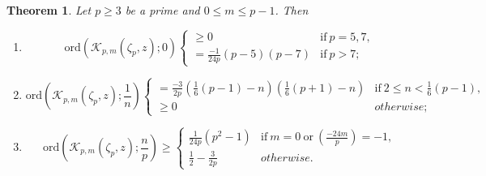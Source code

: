 \documentclass[12pt]{amsart}
\newtheorem{theorem}{Theorem}[section]
\theoremstyle{definition}
\theoremstyle{remark}
\numberwithin{equation}{section}
\newcommand\leg[2]{\genfrac{(}{)}{}{}{#1}{#2}} %
\newcommand\ord{\mbox{ord}}
\begin{document}
\begin{theorem}
\label{thm:ordlb}
Let $p \geq 3$ be a prime and $0 \leq m \leq p-1$. Then 
\begin{enumerate}
\item[(i)]
$$
\ord(\mathcal{K}_{p,m}(\zeta_p,z);0) 
\begin{cases}
      \geq 0 & \text{if}\ p=5, 7, \\
      =\frac{-1}{24p}(p-5)(p-7) & \text{if}\ p>7;
\end{cases} 
$$
\item[(ii)]
$$
\ord(\mathcal{K}_{p,m}(\zeta_p,z);\frac{1}{n}) 
\begin{cases}
 =\frac{-3}{2p}(\frac{1}{6} (p-1)-n)(\frac{1}{6} (p+1)-n) & \text{if}\ 2\leq n< \frac{1}{6}(p-1), \\
 \geq 0 & otherwise;      
\end{cases}
$$  
\item[(iii)]
$$
\ord(\mathcal{K}_{p,m}(\zeta_p,z);\frac{n}{p}) \geq 
\begin{cases}
      \frac{1}{24p}(p^2-1) & \text{if}~m=0~\text{or}~\leg{-24m}{p}=-1  , \\
    \frac{1}{2}-\frac{3}{2p} & otherwise.      
\end{cases}
$$            
\end{enumerate}
\end{theorem}
\end{document}
